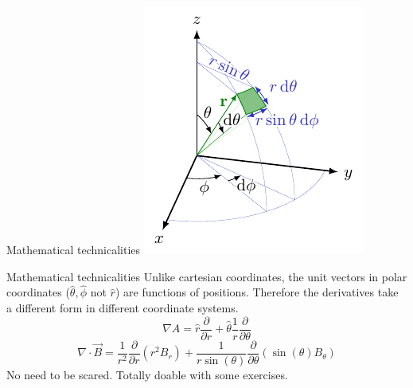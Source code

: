 \begin{frame}
  \begin{PointSix}{Mathematical technicalities}
    \includegraphics[width=0.75\linewidth]{Figures/Magnetics/SphericalCoordinates_Reversed.pdf}
  \end{PointSix}
\end{frame}

\begin{frame}
  \begin{PointSix}{Mathematical technicalities}
    \small Unlike cartesian coordinates, the unit vectors in polar coordinates ($\hat{\theta},\hat{\phi}$ not $\hat{r}$) are functions of positions. Therefore the derivatives take a different form in different coordinate systems.
    $$
    \nabla A = \hat{r}\frac{\partial}{\partial r} + \hat{\theta} \frac{1}{r}\frac{\partial}{\partial \theta}
    $$
    $$
    \nabla \cdot \vec{B} = \frac{1}{r^2}\frac{\partial}{\partial r}\left(r^2B_r \right)+\frac{1}{r\sin(\theta)}\frac{\partial}{\partial \theta}\left(\sin(\theta) B_\theta \right)
    $$
    \small No need to be scared. Totally doable with some exercises.
  \end{PointSix}
\end{frame}

